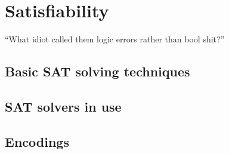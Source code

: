 \chapter{Satisfiability}
\label{ch:sat-solving}
\vspace{50pt}

\enquote{What idiot called them logic errors rather than bool shit?}

\section{Basic SAT solving techniques}
\section{SAT solvers in use}
\section{Encodings}
